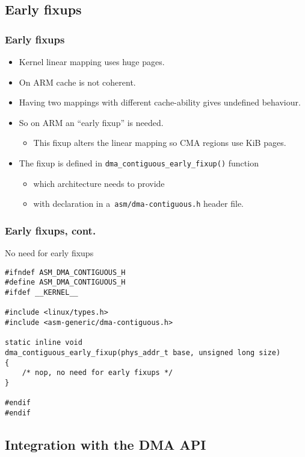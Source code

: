 \subsection{Early fixups}

\begin{frame}
  \frametitle{Early fixups}

  \begin{itemize}
  \item Kernel linear mapping uses huge pages.
  \item On ARM cache is not coherent.
  \item Having two mappings with different cache-ability gives
    undefined behaviour.
  \item So on ARM an “early fixup” is needed.
    \begin{itemize}
    \item This fixup alters the linear mapping so CMA regions use
      \unit[4]{KiB} pages.
    \end{itemize}
  \item The fixup is defined in
    \lstinline|dma_contiguous_early_fixup()| function
    \begin{itemize}
    \item which architecture needs to provide
    \item with declaration in a~\lstinline|asm/dma-contiguous.h| header file.
    \end{itemize}
  \end{itemize}
\end{frame}

\begin{frame}[fragile]
  \frametitle{Early fixups, cont.}

  \begin{block}{No need for early fixups}
\begin{lstlisting}
#ifndef ASM_DMA_CONTIGUOUS_H
#define ASM_DMA_CONTIGUOUS_H
#ifdef __KERNEL__

#include <linux/types.h>
#include <asm-generic/dma-contiguous.h>

static inline void
dma_contiguous_early_fixup(phys_addr_t base, unsigned long size)
{
    /* nop, no need for early fixups */
}

#endif
#endif
\end{lstlisting}
  \end{block}
\end{frame}

\subsection{Integration with the DMA API}

